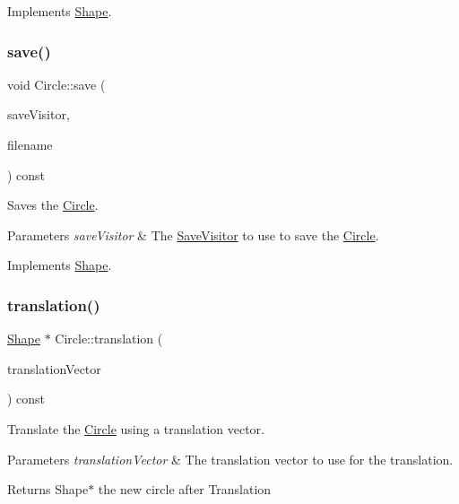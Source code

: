 Implements \hyperlink{class_shape_abfc7a673b8a6d9a4d646dc15c771aa0d}{Shape}.

\hypertarget{class_circle_a91f2af619cc0465ae297ea88ce3b6c23}{}\label{class_circle_a91f2af619cc0465ae297ea88ce3b6c23} 
\subsubsection{\texorpdfstring{save()}{save()}}
{\footnotesize\ttfamily void Circle\+::save (\begin{DoxyParamCaption}\item[{const \hyperlink{class_save_visitor}{Save\+Visitor} $\ast$}]{save\+Visitor,  }\item[{const string \&}]{filename }\end{DoxyParamCaption}) const\hspace{0.3cm}{\ttfamily [virtual]}}

Saves the \hyperlink{class_circle}{Circle}. 
\begin{DoxyParams}{Parameters}
{\em save\+Visitor} & The \hyperlink{class_save_visitor}{Save\+Visitor} to use to save the \hyperlink{class_circle}{Circle}. \\
\hline
\end{DoxyParams}


Implements \hyperlink{class_shape_ae1477829e1b06aad805b8b76312f87bc}{Shape}.

\hypertarget{class_circle_ad3b54b369f44baa1947aa3991f55e068}{}\label{class_circle_ad3b54b369f44baa1947aa3991f55e068} 
\subsubsection{\texorpdfstring{translation()}{translation()}}
{\footnotesize\ttfamily \hyperlink{class_shape}{Shape} $\ast$ Circle\+::translation (\begin{DoxyParamCaption}\item[{const \hyperlink{class_vector2_d}{Vector2D} \&}]{translation\+Vector }\end{DoxyParamCaption}) const\hspace{0.3cm}{\ttfamily [virtual]}}

Translate the \hyperlink{class_circle}{Circle} using a translation vector. 
\begin{DoxyParams}{Parameters}
{\em translation\+Vector} & The translation vector to use for the translation. \\
\hline
\end{DoxyParams}
\begin{DoxyReturn}{Returns}
Shape$\ast$ the new circle after Translation 
\end{DoxyReturn}


